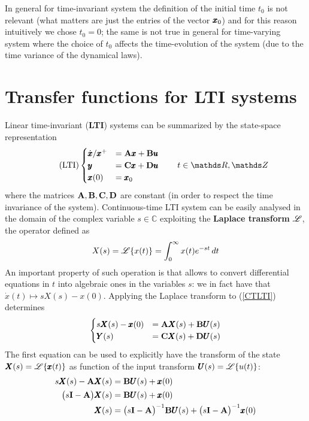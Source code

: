 	In general for time-invariant system the definition of the initial time $t_0$ is not relevant (what matters are just the entries of the vector $\pmb{x}_0$) and for this reason intuitively we chose $t_0=0$;  the same is not true in general for time-varying system where the choice of $t_0$ affects the time-evolution of the system (due to the time variance of the dynamical laws).

	
\section{Transfer functions for LTI systems}
	Linear time-invariant (\textbf{LTI}) systems can be summarized by the state-space representation
	\begin{equation} \tag{LTI} \label{LTI}
		\begin{cases}
			\dx/\xp & = \A \x + \B \u \\ \y & = \C \x + \D \u \\ \x(0) & = \x_0 
		\end{cases} \qquad t \in \mathds R,\mathds Z
	\end{equation}
	where the matrices $\mathbf{A},\mathbf{B},\mathbf{C},\mathbf{D}$ are constant (in order to respect the time invariance of the system). Continuous-time LTI system can be easily analysed in the domain of the complex variable $s \in \mathds C$ exploiting the \textbf{Laplace transform} $\mathscr L$, the operator defined as
	\begin{equation}
		X(s) = \mathscr L\{x(t)\} = \int_0^\infty x(t) e^{-st}\, dt
	\end{equation}
	An important property of such operation is that allows to convert differential equations in $t$ into algebraic ones in the variables $s$: we in fact have that $\dot x(t) \mapsto sX(s) - x(0)$. Applying the Laplace transform to (\ref{CTLTI}) determines
	\begin{equation} \label{eq:dynsys:temp1}
	\begin{cases}
		s \pmb{X}(s) - \pmb{x}(0) & = \mathbf{A} \pmb{X}(s) + \mathbf{B} \pmb{U}(s) \\ 
		\pmb{Y}(s) & = \mathbf{C} \pmb{X}(s) + \mathbf{D} \pmb{U}(s)
	\end{cases}
	\end{equation}
	The first equation can be used to explicitly have the transform of the state $\pmb{X}(s) = \mathscr L\{\pmb{x}(t)\}$ as function of the input transform $\pmb{U}(s) = \mathscr L\{u(t)\}$:
	\begin{align*}
		s\pmb{X}(s) - \mathbf{A} \pmb{X}(s) & = \mathbf{B} \pmb{U}(s) + \pmb{x}(0) \\
		\big(s\mathbf{I} - \mathbf{A} \big) \pmb{X}(s) & = \mathbf{B} \pmb{U}(s) + \pmb{x}(0) \\
		\pmb{X}(s) & = \big(s\mathbf{I} - \mathbf{A} \big)^{-1}\mathbf{B} \pmb{U}(s)  + \big(s\mathbf{I} - \mathbf{A} \big)^{-1} \pmb{x}(0) \\
	\end{align*}
